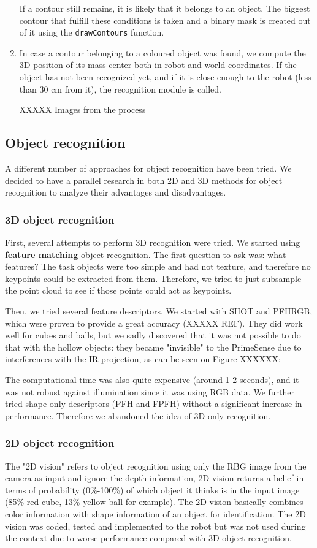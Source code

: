\begin{enumerate}
If a contour still remains, it is likely that it belongs to an object. The biggest contour that fulfill these conditions is taken and a binary mask is created out of it using the \texttt{drawContours} function.

\item In case a contour belonging to a coloured object was found, we compute the 3D position of its mass center both in robot and world coordinates. If the object has not been recognized yet, and if it is close enough to the robot (less than 30 cm from it), the recognition module is called.

XXXXX Images from the process
\end{enumerate}

\subsection{Object recognition}
A different number of approaches for object recognition have been tried. We decided to have a parallel research in both 2D and 3D methods for object recognition to analyze their advantages and disadvantages. 

\subsubsection{3D object recognition}
First, several attempts to perform 3D recognition were tried. We started using \textbf{feature matching} object recognition. The first question to ask was: what features? The task objects were too simple and had not texture, and therefore no keypoints could be extracted from them. Therefore, we tried to just subsample the point cloud to see if those points could act as keypoints.

Then, we tried several feature descriptors. We started with SHOT and PFHRGB, which were proven to provide a great accuracy (XXXXX REF). They did work well for cubes and balls, but we sadly discovered that it was not possible to do that with the hollow objects: they became "invisible" to the PrimeSense due to interferences with the IR projection, as can be seen on Figure XXXXXX: 

The computational time was also quite expensive (around 1-2 seconds), and it was not robust against illumination since it was using RGB data. We further tried shape-only descriptors (PFH and FPFH) without a significant increase in performance. Therefore we abandoned the idea of 3D-only recognition.

\subsubsection{2D object recognition}
The "2D vision" refers to object recognition using only the RBG image from the camera as input and ignore the depth information, 2D vision returns a belief in terms of probability (0\%-100\%) of which object it thinks is in the input image (85\% red cube, 13\% yellow ball for example). The 2D vision basically combines color information with shape information of an object for identification. The 2D vision was coded, tested and implemented to the robot but was not used during the context due to worse performance compared with 3D object recognition.

